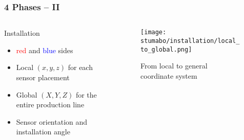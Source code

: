\begin{frame}
    \frametitle{4 Phases -- II}
    \vspace*{\fill}
    \begin{columns}[onlytextwidth, c]
        \begin{column}{.47\textwidth}
            \begin{exampleblock}{Installation}
                \begin{itemize}
                    \item \textcolor{red}{red} and \textcolor{blue}{blue} sides
                    \item Local $(x,y,z)$ for each sensor placement
                    \item Global $(X,Y,Z)$ for the entire production line
                    \item Sensor orientation and installation angle
                \end{itemize}
            \end{exampleblock}
        \end{column}
        \begin{column}{.52\textwidth}
            \begin{figure}
                \texttt{[image: stumabo/installation/local\_to\_global.png]}
                \caption{From local to general coordinate system}
            \end{figure}
        \end{column}
    \end{columns}
    \vspace*{\fill}
\end{frame}

